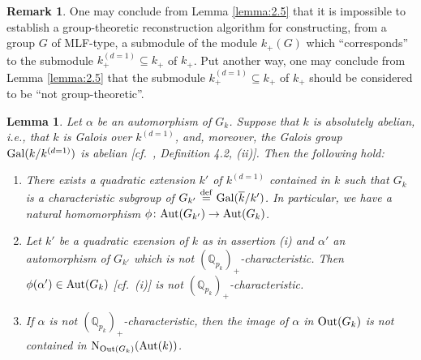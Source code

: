 \documentclass[11pt,showkeys]{article}
\theoremstyle{theorem}
\newtheorem{lem}[theorem]{Lemma}
\theoremstyle{definition}
\newtheorem{remark}[theorem]{Remark}
\def\bQ{{\mathbb Q}}
\def\defeq{ \ {\stackrel{\mathrm{def}}{=}} \ }
\begin{document}
\begin{remark}\label{remark:2.6}
One may conclude from Lemma \ref{lemma:2.5} that 
it is impossible to establish a group-theoretic 
reconstruction algorithm for constructing, from a group 
$G$ of MLF-type, a submodule of the module $k_+(G)$ 
which ``corresponds'' to the submodule $k^{(d=1)}_+ 
\subseteq k_+$ of $k_+$.  Put another way, one may 
conclude from Lemma \ref{lemma:2.5} that the 
submodule $k^{(d=1)}_+ \subseteq k_+$ of $k_+$ should 
be considered to be ``not group-theoretic''.  
\end{remark}


\begin{lem}\label{lemma:2.7}
Let $\alpha$ be an automorphism of $G_k$. Suppose that $k$ is absolutely abelian, i.e., that $k$ is Galois over $k^{(d=1)}$, and, moreover, the Galois group ${\rm Gal}(k/k^{(d=1)})$ is abelian [cf.\ \cite{Hoshi2}, Definition 4.2, (ii)]. Then the following hold: 
\begin{comment}
Let $k$ be an absolutely abelian [cf.\ \cite{Hoshi2}, Definition 4.2, (ii)] MLF such that $d_k$ is even and $p_k > 2$ and $\alpha \in {\rm Aut}(G_k)$ an automorphism of $G_k$. Write $\alpha_{+} \in {\rm Aut}(k_{+})$ for the group-theoretic automorphism induced by $\alpha$. Then the following hold: 
\end{comment} 
\begin{enumerate}[label=(\roman*),ref=(\roman*)]
	\item[\rm (i)] There exists a quadratic extension $k'$ of $k^{(d = 1)}$ contained in $k$  such that $G_k$ is a characteristic subgroup of $G_{k'} \defeq {\rm Gal}(\overline{k}/k')$. In particular, we have a natural homomorphism $\phi \colon {\rm Aut}(G_{k'}) \rightarrow {\rm Aut}(G_k)$. \label{lemma:2.7:statement:1} 
    \item[\rm (ii)] Let $k'$ be a quadratic exension of $k$ as in assertion (i) and $\alpha'$ an automorphism of $G_{k'}$ which is not $(\bQ_{p_k})_+$-characteristic. Then $\phi(\alpha') \in {\rm Aut}(G_k)$ [cf.\ (i)] is not $(\bQ_{p_k})_+$-characteristic. \label{lemma:2.7:statement:2}
    \item[\rm (iii)] If $\alpha$ is not $(\bQ_{p_k})_+$-characteristic, then the image of $\alpha$ in ${\rm Out}(G_k)$ is not contained in ${\rm N}_{{\rm Out}(G_k)}({\rm Aut}(k))$. \label{lemma:2.7:statement:3}
\end{enumerate}
\end{lem}
\end{document}
